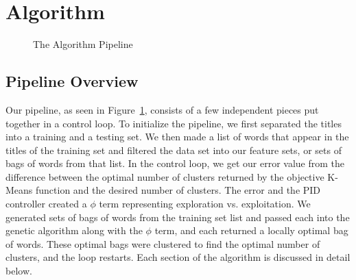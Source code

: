 \documentclass{sig-alternate}
\begin{document}
\section{Algorithm}
\begin{figure}[t]
\centering
{}
\caption{The Algorithm Pipeline}
\label{fig:pipeline}
\end{figure}
\subsection{Pipeline Overview}
Our pipeline, as seen in Figure~\ref{fig:pipeline}, consists of a few independent pieces put together in a control loop. To initialize the pipeline, we first separated the titles into a training and a testing set. We then made a list of words that appear in the titles of the training set and filtered the data set into our feature sets, or sets of bags of words from that list. In the control loop, we get our error value from the difference between the optimal number of clusters returned by the objective K-Means function and the desired number of clusters. The error and the PID controller created a $\phi$ term representing exploration vs. exploitation. We generated sets of bags of words from the training set list and passed each into the genetic algorithm along with the $\phi$ term, and each returned a locally optimal bag of words. These optimal bags were clustered to find the optimal number of clusters, and the loop restarts. Each section of the algorithm is discussed in detail below.
\end{document}
